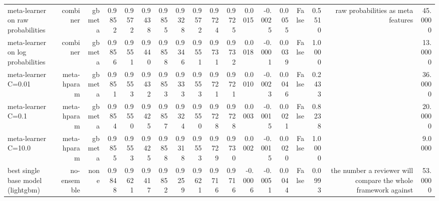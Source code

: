 \begin{table}[t]
{\begin{tabular}{lrrrrrrrrrrrrrrrrr}
meta-learner on raw probabilities & combiner & gbmeta & 0.9852 & 0.9572 & 0.9438 & 0.9855 & 0.9328 & 0.9572 & 0.9724 & 0.9725 & 0.0015 & -0.0025 & 0.0055 & False & 0.5510 & raw probabilities as meta features & 45.0000 \\
meta-learner on log probabilities & combiner & gbmeta & 0.9856 & 0.9551 & 0.9440 & 0.9858 & 0.9346 & 0.9551 & 0.9731 & 0.9732 & 0.0018 & -0.0001 & 0.0039 & False & 1.0000 &  & 13.0000 \\
meta-learner C=0.01 & meta-hparam & gbmeta & 0.9851 & 0.9553 & 0.9432 & 0.9853 & 0.9333 & 0.9553 & 0.9721 & 0.9721 & 0.0010 & -0.0023 & 0.0046 & False & 0.2433 &  & 36.0000 \\
meta-learner C=0.1 & meta-hparam & gbmeta & 0.9854 & 0.9550 & 0.9425 & 0.9857 & 0.9324 & 0.9550 & 0.9728 & 0.9728 & 0.0003 & -0.0015 & 0.0021 & False & 0.8238 &  & 20.0000 \\
meta-learner C=10.0 & meta-hparam & gbmeta & 0.9855 & 0.9553 & 0.9425 & 0.9858 & 0.9318 & 0.9553 & 0.9729 & 0.9730 & 0.0002 & -0.0015 & 0.0020 & False & 1.0000 &  & 9.0000 \\
best single base model (lightgbm) & no-ensemble & none & 0.9848 & 0.9621 & 0.9417 & 0.9852 & 0.9259 & 0.9621 & 0.9716 & 0.9716 & -0.0006 & -0.0051 & 0.0044 & False & 0.0993 & the number a reviewer will compare the whole framework against & 53.0000 \\
\bottomrule
\end{tabular}
}
\end{table}
